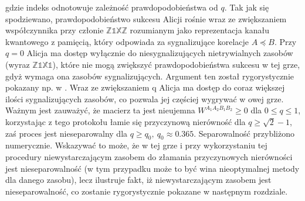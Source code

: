 \documentclass[10pt]{article} %
\newcommand{\WAll}{W^{A_1A_2B_1B_2}}
\newcommand{\X}{\mathbb{X}}
\newcommand{\Z}{\mathbb{Z}}
\newcommand{\I}{\mathbb{1}}
\begin{document}
gdzie indeks odnotowuje zależność prawdopodobieństwa od $q$. Tak jak się spodziewano, prawdopodobieństwo sukcesu Alicji rośnie wraz ze zwiększaniem współczynnika przy członie $\Z\I\X\Z$ rozumianym jako reprezentacja kanału kwantowego z pamięcią, który odpowiada za sygnalizujące korelacje $A \preceq B$.
Przy $q = 0$ Alicja ma dostęp wyłącznie do niesygnalizujących nietrywialnych zasobów (wyraz $\Z\I\X\I$), które nie mogą zwiększyć prawdopodobieństwa sukcesu w tej grze, gdyż wymaga ona zasobów sygnalizujących. Argument ten został rygorystycznie pokazany np. w \cite{mp_gyni}. Wraz ze zwiększaniem q Alicja ma dostęp do coraz
większej ilości sygnalizujących zasobów, co pozwala jej częściej wygrywać w owej grze. Ważnym jest zauważyć, że macierz ta jest nieujemna $\WAll \geq 0$ dla $0 \leq q \leq 1$, korzystając z tego protokołu łamie się przyczynową nierówność dla $q \geq \sqrt{2} - 1$, zaś proces jest nieseparowalny dla $q \geq q_0,~q_0 \approx 0.365$.
Separowalność przybliżono numerycznie. Wskazywać to może, że w tej grze i przy wykorzystaniu tej procedury niewystarczającym zasobem do złamania przyczynowych nierówności jest nieseparowalność (w tym przypadku może to być wina nieoptymalnej metody dla danego zasobu), lecz ilustruje fakt, iż niewystarczającym zasobem jest nieseparowalność, co zostanie rygorystycznie pokazane w następnym rozdziale.
\end{document}
